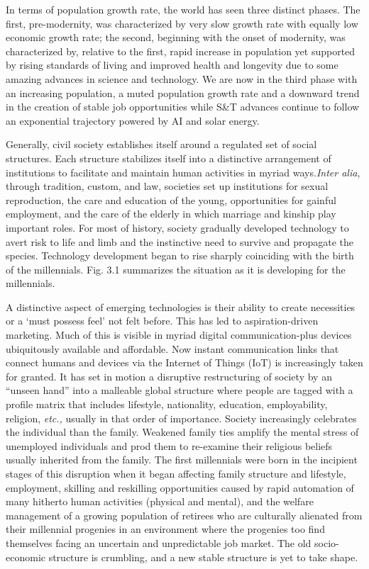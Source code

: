\begin{multicols}{2}
In terms of population growth rate, the world has seen three distinct phases. The first, pre-modernity, was characterized by very slow growth rate with equally low economic growth rate; the second, beginning with the onset of modernity, was characterized by, relative to the first, rapid increase in population yet supported by rising standards of living and improved health and longevity due to some amazing advances in science and technology. We are now in the third phase with an increasing population, a muted population growth rate and a downward trend in the creation of stable job opportunities while S\&T advances continue to follow an exponential trajectory powered by AI and solar energy.

Generally, civil society establishes itself around a regulated set of social structures. Each structure stabilizes itself into a distinctive arrangement of institutions to facilitate and maintain human activities in myriad ways.\textit{Inter alia}, through tradition, custom, and law, societies set up institutions for sexual reproduction, the care and education of the young, opportunities for gainful employment, and the care of the elderly in which marriage and kinship play important roles. For most of history, society gradually developed technology to avert risk to life and limb and the instinctive need to survive and propagate the species. Technology development began to rise sharply coinciding with the birth of the millennials. Fig. 3.1 summarizes the situation as it is developing for the millennials. 

A distinctive aspect of emerging technologies is their ability to create necessities or a ‘must possess feel' not felt before. This has led to aspiration-driven marketing. Much of this is visible in myriad digital communication-plus devices ubiquitously available and affordable. Now instant communication links that connect humans and devices via the Internet of Things (IoT) is increasingly taken for granted. It has set in motion a disruptive restructuring of society by an “unseen hand” into a malleable global structure where people are tagged with a profile matrix that includes lifestyle, nationality, education, employability, religion, \textit{etc.,} usually in that order of importance. Society increasingly celebrates the individual than the family. Weakened family ties amplify the mental stress of unemployed individuals and prod them to re-examine their religious beliefs usually inherited from the family. The first millennials were born in the incipient stages of this disruption when it began affecting family structure and lifestyle, employment, skilling and reskilling opportunities caused by rapid automation of many hitherto human activities (physical and mental), and the welfare management of a growing population of retirees who are culturally alienated from their millennial progenies in an environment where the progenies too find themselves facing an uncertain and unpredictable job market. The old socio-economic structure is crumbling, and a new stable structure is yet to take shape.


\end{multicols}
